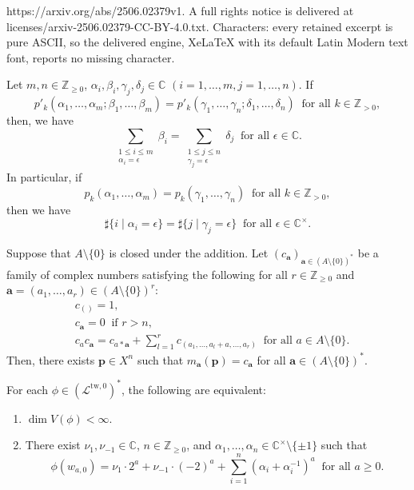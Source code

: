 \documentclass[10pt,a4paper]{amsart}
\begin{document}
https://arxiv.org/abs/2506.02379v1. A full rights notice is delivered at licenses/arxiv-2506.02379-CC-BY-4.0.txt. Characters: every retained excerpt is pure ASCII, so the delivered engine, XeLaTeX with its default Latin Modern text font, reports no missing character.
\begin{prop}\label{prop: coincidence of p'}
  Let $m,n \in \mathbb{Z}_{\geq 0}$, $\alpha_i,\beta_i,\gamma_j,\delta_j \in \mathbb{C}$ $(i=1,\dots,m,j=1,\dots,n)$.
  If
  \[
    p'_k(\alpha_1,\dots,\alpha_m;\beta_1,\dots,\beta_m) = p'_k(\gamma_1,\dots,\gamma_n;\delta_1,\dots,\delta_n) \ \text{ for all } k \in \mathbb{Z}_{> 0},
  \]
  then, we have
  \[
    \sum_{\substack{1 \leq i \leq m\\\alpha_i=\epsilon}} \beta_i = \sum_{\substack{1 \leq j \leq n\\\gamma_j=\epsilon}} \delta_j \ \text{ for all } \epsilon \in \mathbb{C}.
  \]
  In particular, if
  \[
    p_k(\alpha_1,\dots,\alpha_m) = p_k(\gamma_1,\dots,\gamma_n) \ \text{ for all } k \in \mathbb{Z}_{> 0},
  \]
  then we have
  \[
    \sharp\{ i \mid \alpha_i = \epsilon \} = \sharp\{ j \mid \gamma_j = \epsilon \} \ \text{ for all } \epsilon \in \mathbb{C}^\times.
  \]
\end{prop}

\begin{thm}\label{thm: sufficient condition for evaluation2}
  Suppose that $A \setminus \{0\}$ is closed under the addition.
  Let $(c_\mathbf{a})_{\mathbf{a} \in (A \setminus \{0\})^*}$ be a family of complex numbers satisfying the following for all $r \in \mathbb{Z}_{\geq 0}$ and $\mathbf{a} = (a_1,\dots,a_r) \in (A \setminus \{0\})^r$$:$
  \begin{align*}
    &c_{()} = 1,\\
    &c_\mathbf{a} = 0 \ \text{ if } r > n,\\
    &c_a c_\mathbf{a} = c_{a*\mathbf{a}} + \sum_{l=1}^r c_{(a_1,\dots,a_l+a,\dots,a_r)} \ \text{ for all } a \in A \setminus \{0\}.
  \end{align*}
  Then, there exists $\mathbf{p} \in X^n$ such that $m_\mathbf{a}(\mathbf{p}) = c_\mathbf{a}$ for all $\mathbf{a} \in (A \setminus \{0\})^*$.
\end{thm}

\begin{thm}\label{thm: classification AI1}
  For each $\phi \in (\mathcal{L}^{\mathrm{tw},0})^*$, the following are equivalent:
  \begin{enumerate}
    \item $\dim V(\phi) < \infty$.
    \item There exist $\nu_1,\nu_{-1} \in \mathbb{C}$, $n \in \mathbb{Z}_{\geq 0}$, and $\alpha_1,\dots,\alpha_n \in \mathbb{C}^\times \setminus \{ \pm 1 \}$ such that
    \[
      \phi(w_{a,0}) = \nu_1 \cdot 2^a + \nu_{-1} \cdot (-2)^a + \sum_{i=1}^n (\alpha_i+\alpha_i^{-1})^a \ \text{ for all } a \geq 0.
    \]
  \end{enumerate}
\end{thm}
\end{document}
